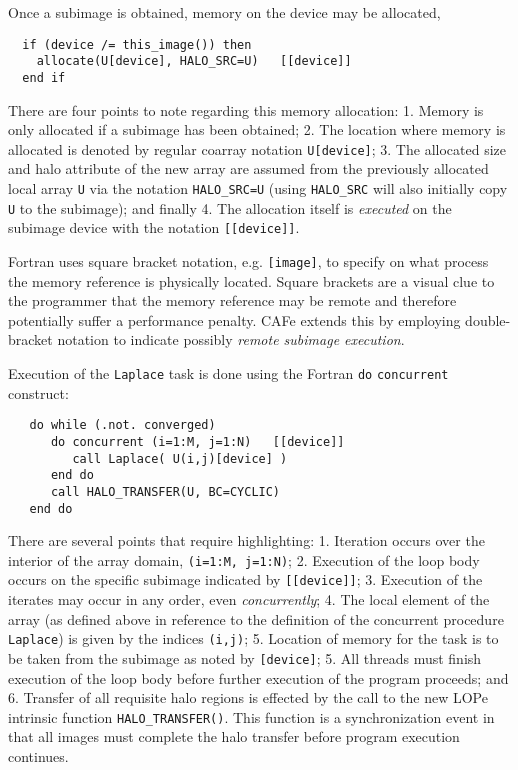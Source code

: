 Once a subimage is obtained, memory on the device may be allocated,
\begin{verbatim}
  if (device /= this_image()) then
    allocate(U[device], HALO_SRC=U)   [[device]]
  end if
\end{verbatim}
There are four points to note regarding this memory allocation: 1. Memory is only allocated if a
subimage has been obtained; 2. The location where memory is allocated is denoted by regular coarray
notation \texttt{U[device]}; 3. The allocated size and halo attribute of the new array are assumed
from the previously allocated local array \texttt{U} via the notation \texttt{HALO\_SRC=U} (using
\texttt{HALO\_SRC} will also initially copy \texttt{U} to the subimage); and finally 4. The
allocation itself is \emph{executed} on the subimage device with the notation \texttt{[[device]]}.

Fortran uses square bracket notation, e.g. \texttt{[image]}, to specify on what process the
memory reference is physically located.  Square brackets are a visual clue to the
programmer that the memory reference may be remote and therefore potentially suffer a
performance penalty.  CAFe extends this by employing double-bracket notation to indicate
possibly \emph{remote subimage execution}.

Execution of the \texttt{Laplace} task is done using the Fortran \texttt{do}
\texttt{concurrent} construct:
\begin{verbatim}
   do while (.not. converged)
      do concurrent (i=1:M, j=1:N)   [[device]]
         call Laplace( U(i,j)[device] )
      end do
      call HALO_TRANSFER(U, BC=CYCLIC)
   end do
\end{verbatim}
There are several points that require highlighting: 1. Iteration occurs over the interior
of the array domain, \texttt{(i=1:M, j=1:N)}; 2. Execution of the loop body occurs on the
specific subimage indicated by \texttt{[[device]]}; 3. Execution of the iterates may occur
in any order, even \emph{concurrently}; 4. The local element of the array (as
defined above in reference to the definition of the concurrent procedure
\texttt{Laplace}) is given by the indices \texttt{(i,j)}; 5. Location of memory for the
task is to be taken from the subimage as noted by \texttt{[device]}; 5. All threads must finish
execution of the loop body before further execution of the program proceeds; and 6. Transfer of
all requisite halo regions is effected by the call to the new LOPe intrinsic function
\texttt{HALO\_TRANSFER()}.  This function is a synchronization event in that all images must
complete the halo transfer before program execution continues.

